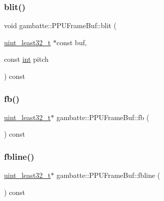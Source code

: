 \subsubsection{\texorpdfstring{blit()}{blit()}}
{\footnotesize\ttfamily void gambatte\+::\+P\+P\+U\+Frame\+Buf\+::blit (\begin{DoxyParamCaption}\item[{\hyperlink{namespacegambatte_a0639f09fccfbbd5a8e0796318768e370}{uint\+\_\+least32\+\_\+t} $\ast$const}]{buf,  }\item[{const \hyperlink{ioapi_8h_a787fa3cf048117ba7123753c1e74fcd6}{int}}]{pitch }\end{DoxyParamCaption}) const\hspace{0.3cm}{\ttfamily [inline]}}

\mbox{\label{classgambatte_1_1PPUFrameBuf_a6d6f6dc400fdd3647e402986b7cfe3a7}} 
\subsubsection{\texorpdfstring{fb()}{fb()}}
{\footnotesize\ttfamily \hyperlink{namespacegambatte_a0639f09fccfbbd5a8e0796318768e370}{uint\+\_\+least32\+\_\+t}$\ast$ gambatte\+::\+P\+P\+U\+Frame\+Buf\+::fb (\begin{DoxyParamCaption}{ }\end{DoxyParamCaption}) const\hspace{0.3cm}{\ttfamily [inline]}}

\mbox{\label{classgambatte_1_1PPUFrameBuf_a63334566c8b1304cb65bebdb17ab808d}} 
\subsubsection{\texorpdfstring{fbline()}{fbline()}}
{\footnotesize\ttfamily \hyperlink{namespacegambatte_a0639f09fccfbbd5a8e0796318768e370}{uint\+\_\+least32\+\_\+t}$\ast$ gambatte\+::\+P\+P\+U\+Frame\+Buf\+::fbline (\begin{DoxyParamCaption}{ }\end{DoxyParamCaption}) const\hspace{0.3cm}{\ttfamily [inline]}}

